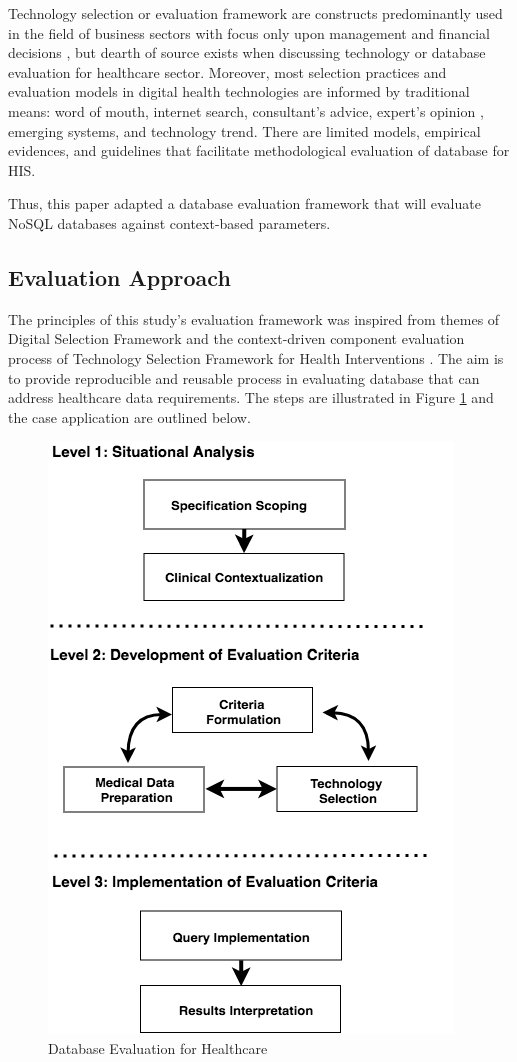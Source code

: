 \documentclass[5p]{elsarticle}
\begin{document}
Technology selection or evaluation framework are constructs predominantly used in the field of business sectors with focus only upon management and financial 
decisions \cite{C.Chan2010300}, but dearth of source exists when discussing technology or database evaluation for healthcare sector. Moreover, most selection 
practices and evaluation models in digital health technologies are informed by traditional means: word of mouth, internet search, consultant’s advice, expert’s opinion \cite{A.Ostrovsky20141}, 
emerging systems, and technology trend. There are limited models, empirical evidences, and guidelines that facilitate methodological evaluation of database for HIS. 

Thus, this paper adapted a database evaluation framework that will evaluate NoSQL databases against context-based parameters. 

\subsection{Evaluation Approach}
The principles of this study's evaluation framework was inspired from themes of Digital Selection Framework \cite{A.Ostrovsky20141} 
and the context-driven component evaluation process of Technology Selection Framework for Health Interventions \cite{C.Chan2010300}. 
The aim is to provide reproducible and reusable process in evaluating database that can address healthcare data requirements.
The steps are illustrated in Figure \ref{fig.framework} and the case application are outlined below. 

\begin{figure}[ht]
    \centering
    \includegraphics[scale=0.55] {SeDB6}
    \caption{Database Evaluation for Healthcare}\label{fig.framework}
\end{figure}
\end{document}
